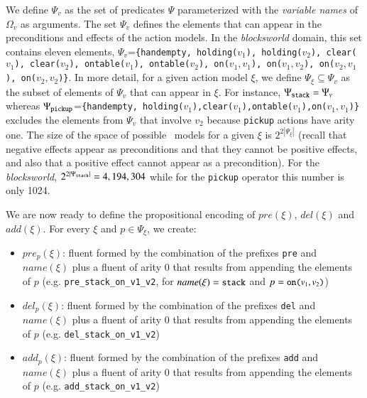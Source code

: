 We define $\Psi_v$ as the set of predicates $\Psi$ parameterized with the {\em variable names} of $\Omega_v$ as arguments. The set $\Psi_v$  defines the elements that can appear in the preconditions and effects of the action models. In the {\em blocksworld} domain, this set contains eleven elements, $\Psi_v$={\small\tt\{handempty, holding($v_1$), holding($v_2$), clear($v_1$), clear($v_2$), ontable($v_1$), ontable($v_2$), on($v_1,v_1$), on($v_1,v_2$), on($v_2,v_1$), on($v_2,v_2$)\}}. In more detail, for a given action model $\xi$, we define $\Psi_{\xi}\subseteq \Psi_v$ as the subset of elements of $\Psi_v$ that can appear in $\xi$. For instance, $\Psi_{\tt stack}=\Psi_v$ whereas $\Psi_{\tt pickup}$={\small\tt\{handempty, holding($v_1$),clear($v_1$),ontable($v_1$),on($v_1,v_1$)\}} excludes the elements from $\Psi_v$ that involve $v_2$ because {\small\tt pickup} actions have arity one. The size of the space of possible \strips\ models for a given $\xi$ is $2^{2|\Psi_{\xi}|}$ (recall that negative effects appear as preconditions and that they cannot be positive effects, and also that a positive effect cannot appear as a precondition). For the {\em blocksworld}, $2^{2|\Psi_{\tt stack}|}=4,194,304$ while for the {\tt pickup} operator this number is only 1024.

We are now ready to define the propositional encoding of $pre(\xi)$, $del(\xi)$ and $add(\xi)$. For every $\xi$ and $p\in \Psi_{\xi}$, we create:

\begin{itemize}
\item $pre_p(\xi)$: fluent formed by the combination of the prefixes {\small \texttt{pre}} and $name(\xi)$ plus a fluent of arity 0 that results from appending the elements of $p$ (e.g. {\small \texttt{pre\_stack\_on\_v1\_v2}}, for $name(\xi)={\small\texttt{stack}}$ and $p={\small\texttt{on($v_1,v_2$)}}$)
\item $del_p(\xi)$: fluent formed by the combination of the prefixes {\small \texttt{del}} and $name(\xi)$ plus a fluent of arity 0 that results from appending the elements of $p$ (e.g. {\small  \texttt{del\_stack\_on\_v1\_v2}})
\item $add_p(\xi)$: fluent formed by the combination of the prefixes {\small \texttt{add}} and $name(\xi)$ plus a fluent of arity 0 that results from appending the elements of $p$ (e.g. {\small \texttt{add\_stack\_on\_v1\_v2}})
\end{itemize}



